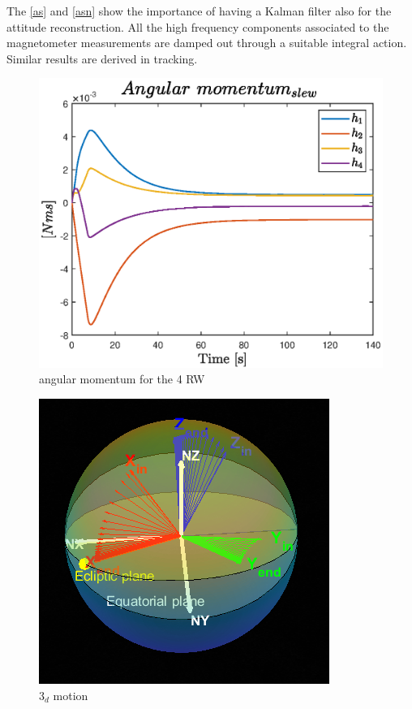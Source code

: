 \documentclass[11pt]{article}
\begin{document}
The \ref{as} and \ref{asn} show the importance of having a Kalman filter also for the attitude reconstruction. All the high frequency components associated  to the magnetometer measurements are damped out through a suitable integral action. Similar results are derived  in tracking.



\begin{minipage}{.45\textwidth}
\begin{figure} [H]
\centering 
\includegraphics[scale=0.55]{ang_mom_slew.eps}
\caption{ angular momentum for the 4 RW}
\end{figure}
\end{minipage}
\begin{minipage}{.55\textwidth}
\label{rwrr}
\begin{figure} [H]
\centering 
\includegraphics[scale=0.9]{SPHERE_SLEW.PNG}
\caption{ $3_d$ motion}
\label{3d_motion}
\end{figure}
\end{minipage}\\
\end{document}
